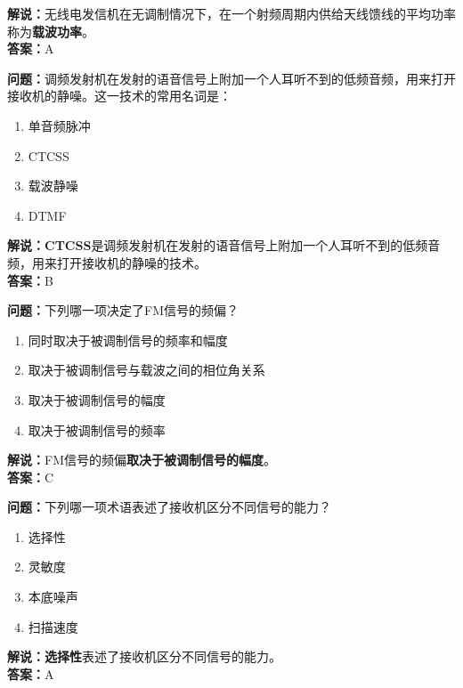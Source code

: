 \documentclass{ctexbook}
\begin{document}
\noindent\textbf{解说：}无线电发信机在无调制情况下，在一个射频周期内供给天线馈线的平均功率称为\textbf{载波功率}。\\\noindent\textbf{答案：}A%


\bigskip


\noindent\textbf{问题：}调频发射机在发射的语音信号上附加一个人耳听不到的低频音频，用来打开接收机的静噪。这一技术的常用名词是：

\begin{enumerate}[label=\Alph*), leftmargin=3em]
	\item 单音频脉冲
	\item CTCSS
	\item 载波静噪
	\item DTMF
\end{enumerate}

\noindent\textbf{解说：}\textbf{CTCSS}是调频发射机在发射的语音信号上附加一个人耳听不到的低频音频，用来打开接收机的静噪的技术。\\\noindent\textbf{答案：}B%


\bigskip


\noindent\textbf{问题：}下列哪一项决定了FM信号的频偏？

\begin{enumerate}[label=\Alph*), leftmargin=3em]
	\item 同时取决于被调制信号的频率和幅度
	\item 取决于被调制信号与载波之间的相位角关系
	\item 取决于被调制信号的幅度
	\item 取决于被调制信号的频率
\end{enumerate}

\noindent\textbf{解说：}FM信号的频偏\textbf{取决于被调制信号的幅度}。\\\noindent\textbf{答案：}C%


\bigskip


\noindent\textbf{问题：}下列哪一项术语表述了接收机区分不同信号的能力？

\begin{enumerate}[label=\Alph*), leftmargin=3em]
	\item 选择性
	\item 灵敏度
	\item 本底噪声
	\item 扫描速度
\end{enumerate}

\noindent\textbf{解说：}\textbf{选择性}表述了接收机区分不同信号的能力。\\\noindent\textbf{答案：}A%
\end{document}
